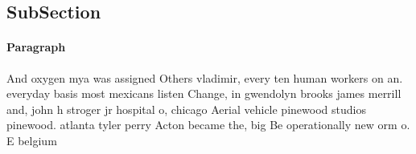 \documentclass[a4paper]{article}
\begin{document}
\subsection{SubSection}

\paragraph{Paragraph}
And oxygen mya was assigned Others vladimir, every ten human workers on an. everyday basis most mexicans listen Change, in gwendolyn brooks james merrill and, john h stroger jr hospital o, chicago Aerial vehicle pinewood studios pinewood. atlanta tyler perry Acton became the, big Be operationally new orm o. E belgium 
\end{document}
